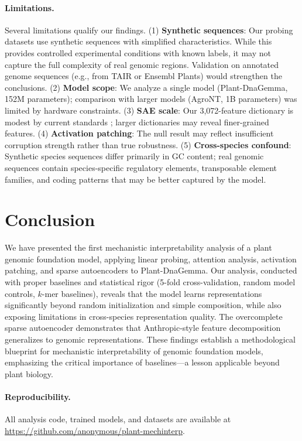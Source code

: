 \documentclass{article}
\begin{document}
\paragraph{Limitations.}
\label{sec:limitations}
Several limitations qualify our findings. (1) \textbf{Synthetic sequences}: Our probing datasets use synthetic sequences with simplified characteristics. While this provides controlled experimental conditions with known labels, it may not capture the full complexity of real genomic regions. Validation on annotated genome sequences (e.g., from TAIR or Ensembl Plants) would strengthen the conclusions. (2) \textbf{Model scope}: We analyze a single model (Plant-DnaGemma, 152M parameters); comparison with larger models (AgroNT, 1B parameters) was limited by hardware constraints. (3) \textbf{SAE scale}: Our 3,072-feature dictionary is modest by current standards \citep{templeton2024scaling}; larger dictionaries may reveal finer-grained features. (4) \textbf{Activation patching}: The null result may reflect insufficient corruption strength rather than true robustness. (5) \textbf{Cross-species confound}: Synthetic species sequences differ primarily in GC content; real genomic sequences contain species-specific regulatory elements, transposable element families, and coding patterns that may be better captured by the model.

\section{Conclusion}

We have presented the first mechanistic interpretability analysis of a plant genomic foundation model, applying linear probing, attention analysis, activation patching, and sparse autoencoders to Plant-DnaGemma. Our analysis, conducted with proper baselines and statistical rigor (5-fold cross-validation, random model controls, $k$-mer baselines), reveals that the model learns representations significantly beyond random initialization and simple composition, while also exposing limitations in cross-species representation quality. The overcomplete sparse autoencoder demonstrates that Anthropic-style feature decomposition generalizes to genomic representations. These findings establish a methodological blueprint for mechanistic interpretability of genomic foundation models, emphasizing the critical importance of baselines---a lesson applicable beyond plant biology.

\paragraph{Reproducibility.} All analysis code, trained models, and datasets are available at \url{https://github.com/anonymous/plant-mechinterp}.



\end{document}
